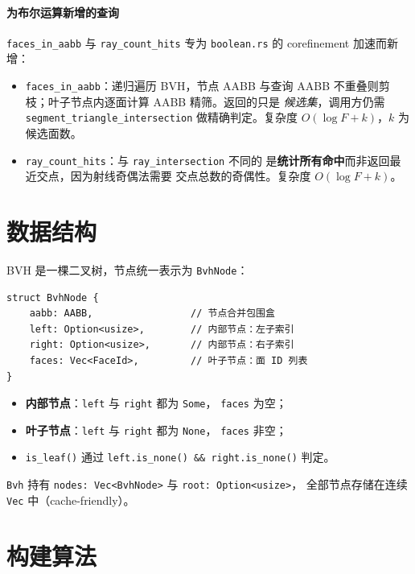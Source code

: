 \documentclass[11pt,a4paper]{article}
\begin{document}
\paragraph{为布尔运算新增的查询}
\texttt{faces\_in\_aabb} 与 \texttt{ray\_count\_hits} 专为
\texttt{boolean.rs} 的 corefinement 加速而新增：
\begin{itemize}
  \item \texttt{faces\_in\_aabb}：递归遍历 BVH，节点 AABB 与查询 AABB
        不重叠则剪枝；叶子节点内逐面计算 AABB 精筛。返回的只是
        \emph{候选集}，调用方仍需 \texttt{segment\_triangle\_intersection}
        做精确判定。复杂度 $O(\log F + k)$，$k$ 为候选面数。
  \item \texttt{ray\_count\_hits}：与 \texttt{ray\_intersection} 不同的
        是\textbf{统计所有命中}而非返回最近交点，因为射线奇偶法需要
        交点总数的奇偶性。复杂度 $O(\log F + k)$。
\end{itemize}

\section{数据结构}

BVH 是一棵二叉树，节点统一表示为 \texttt{BvhNode}：

\begin{lstlisting}
struct BvhNode {
    aabb: AABB,                 // 节点合并包围盒
    left: Option<usize>,        // 内部节点：左子索引
    right: Option<usize>,       // 内部节点：右子索引
    faces: Vec<FaceId>,         // 叶子节点：面 ID 列表
}
\end{lstlisting}

\begin{itemize}
  \item \textbf{内部节点}：\texttt{left} 与 \texttt{right} 都为 \texttt{Some}，
        \texttt{faces} 为空；
  \item \textbf{叶子节点}：\texttt{left} 与 \texttt{right} 都为 \texttt{None}，
        \texttt{faces} 非空；
  \item \texttt{is\_leaf()} 通过 \texttt{left.is\_none() \&\& right.is\_none()} 判定。
\end{itemize}

\texttt{Bvh} 持有 \texttt{nodes: Vec<BvhNode>} 与 \texttt{root: Option<usize>}，
全部节点存储在连续 \texttt{Vec} 中（cache-friendly）。

\section{构建算法}
\end{document}
